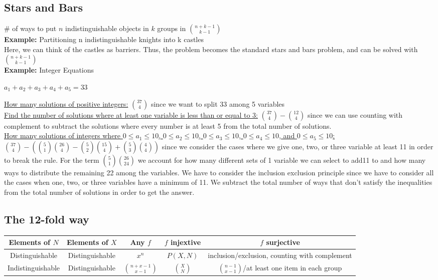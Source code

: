 \documentclass{article}
\begin{document}
\begin{spacing}{1.5}
\subsection {Stars and Bars}
\label{sec:starsbars}
\# of ways to put $n$ indistinguishable objects in $k$ groups in $\binom{n+k-1}{k-1}$\\
\textbf{Example:} Partitioning n indistinguishable knights into k castles\\
Here, we can think of the castles as barriers. Thus, the problem becomes the standard stars and bars problem, and can be solved with $\binom{n+k-1}{k-1}$ \\
\textbf{Example:} Integer Equations
\begin{center}
    $a_1+a_2+a_3+a_4 + a_5 = 33$
\end{center}
\underline{How many solutions of positive integers:} $\binom{37}{4}$ since we want to split 33 among 5 variables\\
\underline{Find the number of solutions where at least one variable is less than or equal to 3:} $\binom{37}{4}-\binom{12}{4}$ since we can use counting with complement to subtract the solutions where every number is at least 5 from the total number of solutions.\\
\newpage
\underline{How many solutions of integers where $0\leq a_1\leq 10$, $0\leq a_2\leq 10$, $0\leq a_3\leq 10$, $0\leq a_4\leq 10$, and $0\leq a_5\leq 10$:} $\binom{37}{4}-(\binom{5}{1}\binom{26}{4} - \binom{5}{2}\binom{15}{4} + \binom{5}{3}\binom{4}{4})$ since we consider the cases where we give one, two, or three variable at least 11 in order to break the rule. For the term $\binom{5}{1}\binom{26}{24}$ we account for how many different sets of 1 variable we can select to add11 to and how many ways to distribute the remaining 22 among the variables. We have to consider the inclusion exclusion principle since we have to consider all the cases when one, two, or three variables have a minimum of 11. We subtract the total number of ways that don't satisfy the inequalities from the total number of solutions in order to get the answer.\\
\subsection{The 12-fold way}
\label{sec:12fold}
\begin{tabular}{|c|c|c|c|c|}
    \hline
    Elements of $N$ & Elements of $X$ & Any $f$ & $f$ injextive & $f$ surjective\\
    \hline
    Distinguishable & Distinguishable & $x^n$ & $P(X, N)$ & inclusion/exclusion, counting with complement \\
    Indistinguishable & Distinguishable & $\binom{n+x-1}{x-1}$ & $\binom{X}{N}$ & $\binom{n-1}{x-1}$/at least one item in each group\\
    \hline
\end{tabular}
%

\end{spacing}
\end{document}
